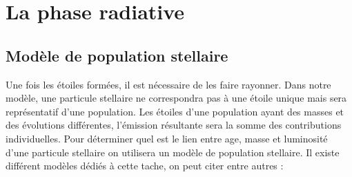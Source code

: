 

\section{La phase radiative}
\label{sec:etoilerad}

%
%
%
%


\subsection{Modèle de population stellaire}
\label{sec:staburst}

Une fois les étoiles formées, il est nécessaire de les faire rayonner.
Dans notre modèle, une particule stellaire ne correspondra pas à une étoile unique mais sera représentatif d'une population.
Les étoiles d'une population ayant des masses et des évolutions différentes, l'émission résultante sera la somme des contributions individuelles.
Pour déterminer quel est le lien entre age, masse et luminosité d'une particule stellaire on utilisera un modèle de population stellaire.
Il existe différent modèles dédiés à cette tache, on peut citer entre autres :

